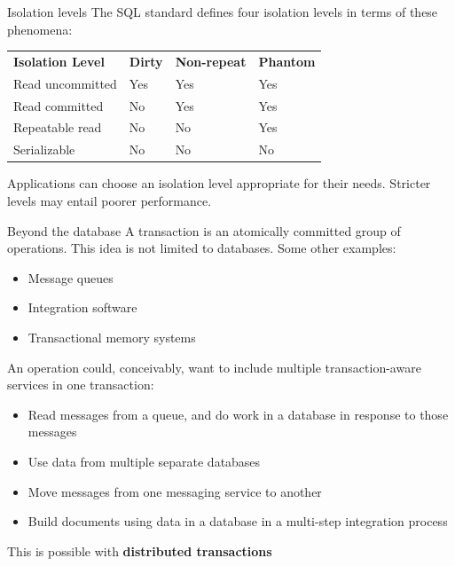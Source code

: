\documentclass[svgnames]{beamer}
\begin{document}
\begin{frame}{Isolation levels}
    The SQL standard defines four isolation levels in terms of these
    phenomena: \\
    \vspace{.5cm}
    \begin{tabular}{llll}
        \textbf{Isolation Level} & \textbf{Dirty} &
        \textbf{Non-repeat} & \textbf{Phantom} \\
        Read uncommitted & Yes & Yes & Yes \\
        Read committed & No & Yes & Yes \\
        Repeatable read & No & No & Yes \\
        Serializable & No & No & No
    \end{tabular}
    \vspace{10pt} \par
    Applications can choose an isolation level appropriate for their needs.
    Stricter levels may entail poorer performance.
\end{frame}

\begin{frame}{Beyond the database}
    A transaction is an atomically committed group of operations. This idea is
    not limited to databases. Some other examples: \\

    \begin{itemize}
        \item Message queues
        \item Integration software
        \item Transactional memory systems
    \end{itemize}
\end{frame}

\begin{frame}
    An operation could, conceivably, want to include multiple transaction-aware services in one transaction:
    \begin{itemize}
        \item Read messages from a queue, and do work in a database in response to those messages
        \item Use data from multiple separate databases
        \item Move messages from one messaging service to another
        \item Build documents using data in a database in a multi-step integration process
    \end{itemize}
    This is possible with \textbf{distributed transactions}
\end{frame}
\end{document}
